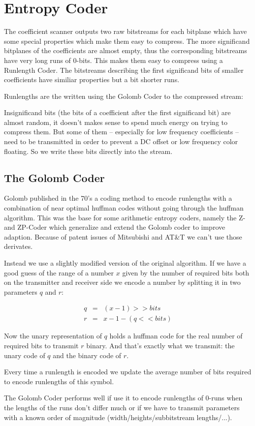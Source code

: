 
\section{ Entropy Coder }
\label{entropy}

The coefficient scanner outputs two raw bitstreams for each bitplane which
have some special properties which make them easy to compress.
The more significand bitplanes of the coefficients are almost empty, thus
the corresponding bitstreams have very long runs of $0$-bits. This makes
them easy to compress using a Runlength Coder. The bitstreams describing
the first significand bits of smaller coefficients have similiar properties
but a bit shorter runs.

Runlengths are the written using the Golomb Coder to the compressed stream:

Insignificand bits (the bits of a coefficient after the first significand bit)
are almost random, it doesn't makes sense to spend much energy on trying
to compress them. But some of them -- especially for low frequency 
coefficients -- need to be transmitted in order to prevent a DC offset or low 
frequency color floating. So we write these bits directly into the stream.


\subsection{ The Golomb Coder }

Golomb published in the 70's a coding method to encode runlengths with a 
combination of near optimal huffman codes without going through the huffman
algorithm. This was the base for some arithmetic entropy coders, namely the 
Z- and ZP-Coder which generalize and extend the Golomb coder to improve adaption.
Because of patent issues of Mitsubishi and AT&T we can't use those derivates.

Instead we use a slightly modified version of the original algorithm. If we 
have a good guess of the range of a number $x$ given by the number of required bits
both on the transmitter and receiver side we encode a number by splitting it in 
two parameters $q$ and $r$:

\begin{eqnarray}
q &=& (x - 1) >> bits     \nonumber\\
r &=& x - 1 - (q << bits) \nonumber
\end{eqnarray}

Now the unary representation of $q$ holds a huffman code for the real number of 
required bits to transmit $r$ binary. And that's exactly what we transmit: the 
unary code of $q$ and the binary code of $r$.

Every time a runlength is encoded we update the average number of bits required
to encode runlengths of this symbol.
 
The Golomb Coder performs well if use it to encode runlengths of 0-runs when the 
lengths of the runs don't differ much or if we have to transmit parameters with 
a known order of magnitude (width/heights/subbitstream lengths/...).



